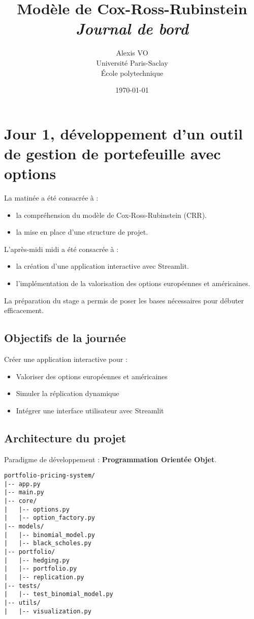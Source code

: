 \documentclass[a4paper,11pt]{article}
\title{\Huge{\textbf{Modèle de Cox-Ross-Rubinstein}}\\ \medskip
      \Huge{\textit{Journal de bord}}\vspace*{0.7cm}}
\author{\LARGE{Alexis VO}\vspace{1cm}\\ \medskip
      Université Paris-Saclay\\École polytechnique}
\date{\vspace{0.2cm}\today}
\begin{document}
\maketitle
\newpage
\tableofcontents
\newpage


\section{Jour 1, développement d’un outil de gestion de portefeuille avec options}
\noindent La matinée a été consacrée à :
\begin{itemize}
    \item la compréhension du modèle de Cox-Ross-Rubinstein (CRR).
    \item la mise en place d'une structure de projet.
\end{itemize}
L'après-midi midi a été consacrée à :
\begin{itemize}
    \item la création d'une application interactive avec Streamlit.
    \item l'implémentation de la valorisation des options européennes et américaines.
\end{itemize}
La préparation du stage a permis de poser les bases nécessaires pour débuter efficacement.

\subsection{Objectifs de la journée}
Créer une application interactive pour :
\begin{itemize}
    \item Valoriser des options européennes et américaines
    \item Simuler la réplication dynamique
    \item Intégrer une interface utilisateur avec Streamlit
\end{itemize}

\subsection{Architecture du projet}
Paradigme de développement : \textbf{Programmation Orientée Objet}.
\begin{verbatim}
portfolio-pricing-system/
|-- app.py
|-- main.py
|-- core/
|   |-- options.py
|   |-- option_factory.py
|-- models/
|   |-- binomial_model.py
|   |-- black_scholes.py
|-- portfolio/
|   |-- hedging.py
|   |-- portfolio.py
|   |-- replication.py
|-- tests/
|   |-- test_binomial_model.py
|-- utils/
|   |-- visualization.py
\end{verbatim}
\end{document}
